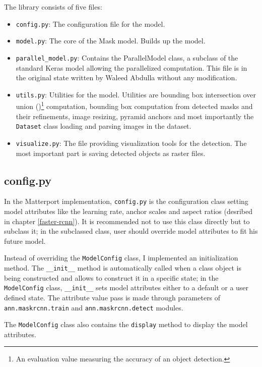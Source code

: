 The library consists of five files:
\begin{itemize}
	 \item \verb|config.py|: The configuration file for the model. 
	 \item \verb|model.py|: The core of the Mask  model. Builds up the model.
	 \item \verb|parallel_model.py|: Contains the ParallelModel class, a subclass of the standard Keras model allowing the parallelized computation. This file is in the original state written by Waleed Abdulla without any modification.
	 \item \verb|utils.py|: Utilities for the model. Utilities are bounding box intersection over union ()\footnote{An evaluation value measuring the accuracy of an object detection.} computation, bounding box computation from detected masks and their refinements, image resizing, pyramid anchors and most importantly the \verb|Dataset| class loading and parsing images in the dataset.
	 \item \verb|visualize.py|: The file providing visualization tools for the detection. The most important part is saving detected objects as raster files.
\end{itemize}

\subsection{config.py}
\label{config}

In the Matterport implementation, \verb|config.py| is the configuration class setting model attributes like the learning rate,  anchor scales and aspect ratios (desribed in chapter \ref{faster-rcnn}). It is recommended not to use this class directly but to subclass it; in the subclassed class, user should override model attributes to fit his future model.

Instead of overriding the \verb|ModelConfig| class, I implemented an initialization method. The \verb|__init__| method is automatically called when a class object is being constructed and allows to construct it in a specific state; in the \verb|ModelConfig| class, \verb|__init__| sets model attributes either to a default or a user defined state. The attribute value pass is made through parameters of \verb|ann.maskrcnn.train| and \verb|ann.maskrcnn.detect| modules.

The \verb|ModelConfig| class also contains the \verb|display| method to display the model attributes.

